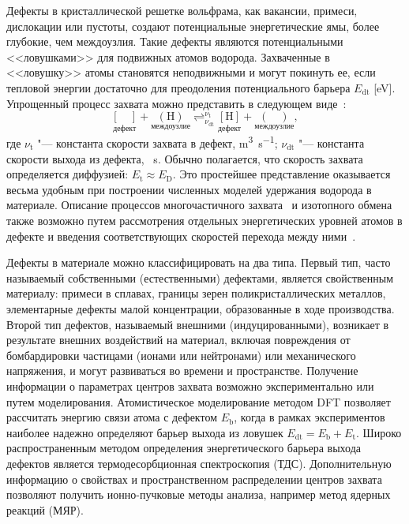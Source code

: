 Дефекты в кристаллической решетке вольфрама, как вакансии, примеси, дислокации или пустоты, создают потенциальные энергетические ямы, более глубокие, чем междоузлия. Такие дефекты являются потенциальными <<ловушками>> для подвижных атомов водорода. Захваченные в <<ловушку>> атомы становятся неподвижными и могут покинуть ее, если тепловой энергии достаточно для преодоления потенциального барьера $E_\mathrm{dt}$ [\si{\electronvolt}]. Упрощенный процесс захвата можно представить в следующем виде~\cite{Drexler2020}:
\begin{equation*}
    \underset{\text{дефект}}{[\quad]} + \underset{\text{междоузлие}}{(\mathrm{H})} \mathop{\rightleftharpoons}^{\nu_\mathrm{t}}_{\nu_\mathrm{dt}}  \underset{\text{дефект}}{[\mathrm{H}]} +  \underset{\text{междоузлие}}{(\quad)},
\end{equation*}
где \( \nu_\mathrm{t} \) "--- константа скорости захвата в дефект, \si{\metre\cubed\per\second}; \( \nu_\mathrm{dt}\) "--- константа скорости выхода из дефекта, \si{\per\second}. Обычно полагается, что скорость захвата определяется диффузией: \( E_\mathrm{t} \approx E_\mathrm{D} \). Это простейшее представление оказывается весьма удобным при построении численных моделей удержания водорода в материале. Описание процессов многочастичного захвата~\cite{Johnson2010,Fernandez2015} и изотопного обмена также возможно путем рассмотрения отдельных энергетических уровней атомов в дефекте и введения соответствующих скоростей перехода между ними~\cite{Schmid2014}.

Дефекты в материале можно классифицировать на два типа. Первый тип, часто называемый собственными (естественными) дефектами, является свойственным материалу: примеси в сплавах, границы зерен поликристаллических металлов, элементарные дефекты малой концентрации, образованные в ходе производства. Второй тип дефектов, называемый внешними (индуцированными), возникает в результате внешних воздействий на материал, включая повреждения от бомбардировки частицами (ионами или нейтронами) или механического напряжения, и могут развиваться во времени и пространстве. Получение информации о параметрах центров захвата возможно экспериментально или путем моделирования. Атомистическое моделирование методом DFT позволяет рассчитать энергию связи атома с дефектом \( E_\mathrm{b} \), когда в рамках экспериментов наиболее надежно определяют барьер выхода из ловушек \( E_\mathrm{dt}=E_\mathrm{b} + E_\mathrm{t} \). Широко распространенным методом определения энергетического барьера выхода дефектов является термодесорбционная спектроскопия (ТДС). Дополнительную информацию о свойствах и пространственном распределении центров захвата позволяют получить ионно-пучковые методы анализа, например метод ядерных реакций (МЯР). 

